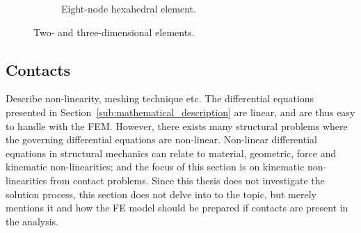 \begin{figure}[t]
\begin{subfigure}{.5\textwidth}
\begin{center}
		\caption{Eight-node hexahedral element.}
		\label{subfig:hexahedral_element}
	\end{center}
	\end{subfigure}%
	\caption{Two- and three-dimensional elements.}
	\label{fig:elements}
\end{figure}



\subsection{Contacts} %
\label{sub:contacts}
Describe non-linearity, meshing technique etc.
The differential equations presented in Section~\ref{sub:mathematical_description} are linear, and are thus easy to handle with the FEM. However, there exists many structural problems where the governing differential equations are non-linear. Non-linear differential equations in structural mechanics can relate to material, geometric, force and kinematic non-linearities; and the focus of this section is on kinematic non-linearities from contact problems. Since this thesis does not investigate the solution process, this section does not delve into to the topic, but merely mentions it and how the FE model should be prepared if contacts are present in the analysis.

